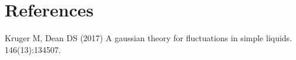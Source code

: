 \documentclass[amsmath,preprintnumbers,10pt,article,notitlepage]{revtex4-1}
\begin{document}

\pagebreak

\section*{References}

\begin{thebibliography}{1}

Kruger M, Dean DS (2017) A gaussian theory for fluctuations in simple liquids.
 146(13):134507.

\end{thebibliography}
\end{document}

